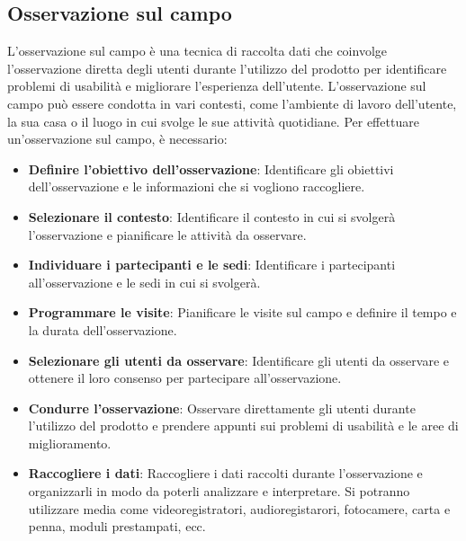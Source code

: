 \documentclass{report}
\begin{document}
	\subsection{Osservazione sul campo}
	L'osservazione sul campo è una tecnica di raccolta dati che coinvolge l'osservazione diretta degli utenti durante l'utilizzo del prodotto per identificare problemi di usabilità e migliorare l'esperienza dell'utente. L'osservazione sul campo può essere condotta in vari contesti, come l'ambiente di lavoro dell'utente, la sua casa o il luogo in cui svolge le sue attività quotidiane. Per effettuare un'osservazione sul campo, è necessario:
	\begin{itemize}
		\item \textbf{Definire l'obiettivo dell'osservazione}: Identificare gli obiettivi dell'osservazione e le informazioni che si vogliono raccogliere.
		\item \textbf{Selezionare il contesto}: Identificare il contesto in cui si svolgerà l'osservazione e pianificare le attività da osservare.
		\item \textbf{Individuare i partecipanti e le sedi}: Identificare i partecipanti all'osservazione e le sedi in cui si svolgerà.
		\item \textbf{Programmare le visite}: Pianificare le visite sul campo e definire il tempo e la durata dell'osservazione.
		\item \textbf{Selezionare gli utenti da osservare}: Identificare gli utenti da osservare e ottenere il loro consenso per partecipare all'osservazione.
		\item \textbf{Condurre l'osservazione}: Osservare direttamente gli utenti durante l'utilizzo del prodotto e prendere appunti sui problemi di usabilità e le aree di miglioramento.
		\item \textbf{Raccogliere i dati}: Raccogliere i dati raccolti durante l'osservazione e organizzarli in modo da poterli analizzare e interpretare. Si potranno utilizzare media come videoregistratori, audioregistarori, fotocamere, carta e penna, moduli prestampati, ecc.
	\end{itemize}
\end{document}
